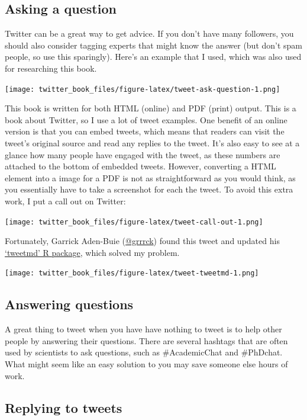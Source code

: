 \documentclass[
]{book}
\begin{document}
\hypertarget{asking-a-question}{%
\subsection{Asking a question}\label{asking-a-question}}

Twitter can be a great way to get advice. If you don't have many followers, you should also consider tagging experts that might know the answer (but don't spam people, so use this sparingly). Here's an example that I used, which was also used for researching this book.

\texttt{[image: twitter\_book\_files/figure-latex/tweet-ask-question-1.png]}

This book is written for both HTML (online) and PDF (print) output. This is a book about Twitter, so I use a lot of tweet examples. One benefit of an online version is that you can embed tweets, which means that readers can visit the tweet's original source and read any replies to the tweet. It's also easy to see at a glance how many people have engaged with the tweet, as these numbers are attached to the bottom of embedded tweets. However, converting a HTML element into a image for a PDF is not as straightforward as you would think, as you essentially have to take a screenshot for each the tweet. To avoid this extra work, I put a call out on Twitter:

\texttt{[image: twitter\_book\_files/figure-latex/tweet-call-out-1.png]}

Fortunately, Garrick Aden-Buie (\href{https://twitter.com/grrrck}{@grrrck}) found this tweet and updated his \href{https://github.com/gadenbuie/tweetrmd}{`tweetmd' R package}, which solved my problem.

\texttt{[image: twitter\_book\_files/figure-latex/tweet-tweetmd-1.png]}

\hypertarget{answering-questions}{%
\subsection{Answering questions}\label{answering-questions}}

A great thing to tweet when you have have nothing to tweet is to help other people by answering their questions. There are several hashtags that are often used by scientists to ask questions, such as \#AcademicChat and \#PhDchat. What might seem like an easy solution to you may save someone else hours of work.

\hypertarget{replying-to-tweets}{%
\subsection{Replying to tweets}\label{replying-to-tweets}}
\end{document}
